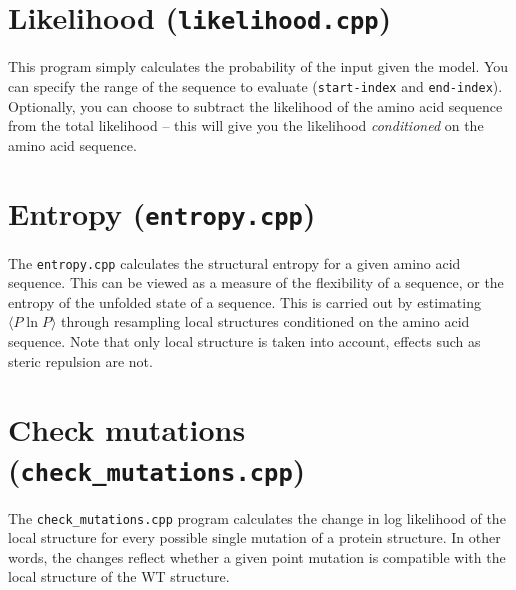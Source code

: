 \section{Likelihood (\texttt{likelihood.cpp})}
\label{sec:likelihood}

This program simply calculates the probability of the input given the
model. You can specify the range of the sequence to evaluate
(\texttt{start-index} and \texttt{end-index}). Optionally, you can choose
to subtract the likelihood of the amino acid sequence from the total
likelihood -- this will give you the likelihood \emph{conditioned} on
the amino acid sequence.


\section{Entropy (\texttt{entropy.cpp})}
\label{sec:entropy}

The \texttt{entropy.cpp} calculates the structural entropy for a given amino
acid sequence. This can be viewed as a measure of the flexibility of a
sequence, or the entropy of the unfolded state of a sequence. This is carried
out by estimating $\langle P \ln P \rangle$ through resampling local structures
conditioned on the amino acid sequence. Note that only local structure is taken
into account, effects such as steric repulsion are not. 

\section{Check mutations (\texttt{check\_mutations.cpp})}
\label{sec:check-mutations}

The \texttt{check\_mutations.cpp} program calculates the change in log
likelihood of the local structure for every possible single mutation of a
protein structure. In other words, the changes reflect whether a
given point mutation is compatible with the local structure of the WT structure. 


